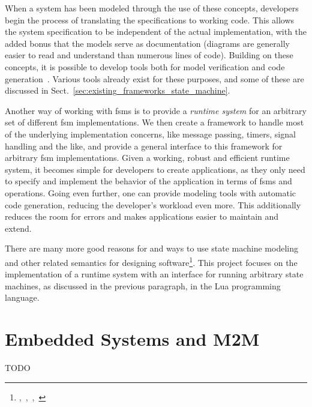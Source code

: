 When a system has been modeled through the use of these concepts, developers begin the process of translating the specifications to working code. This allows the system specification to be independent of the actual implementation, with the added bonus that the models serve as documentation (diagrams are generally easier to read and understand than numerous lines of code). Building on these concepts, it is possible to develop tools both for model verification and code generation~\cite{article:compositional_arctis}. Various tools already exist for these purposes, and some of these are discussed in Sect.~\ref{sec:existing_frameworks_state_machine}.

Another way of working with \glspl{fsm} is to provide a \emph{runtime system} for an arbitrary set of different \gls{fsm} implementations. We then create a framework to handle most of the underlying implementation concerns, like message passing, timers, signal handling and the like, and provide a general interface to this framework for arbitrary \gls{fsm} implementations. Given a working, robust and efficient runtime system, it becomes simple for developers to create applications, as they only need to specify and implement the behavior of the application in terms of \glspl{fsm} and operations. Going even further, one can provide modeling tools with automatic code generation, reducing the developer's workload even more. This additionally reduces the room for errors and makes applications easier to maintain and extend.

There are many more good reasons for and ways to use state machine modeling and other related semantics for designing software\footnote{\cite{article:itut_methodologies},~\cite{chapter:structural_modeling_uml},~\cite{conference:system_analysis_modeling},~\cite{phd:frank}}. This project focuses on the implementation of a runtime system with an interface for running arbitrary state machines, as discussed in the previous paragraph, in the Lua programming language.

\section{Embedded Systems and M2M}
\label{sec:embedded_m2m}
TODO